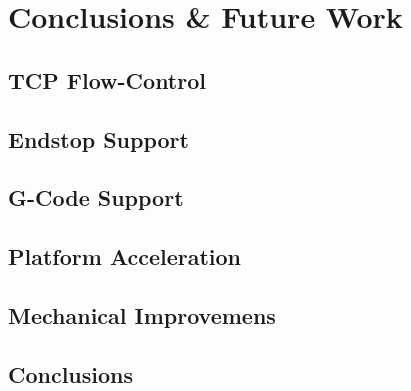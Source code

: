 \chapter{Conclusions \& Future Work}
	
	\section{TCP Flow-Control}
	
	\section{Endstop Support}
	
	\section{G-Code Support}
	
	\section{Platform Acceleration}
	
	\section{Mechanical Improvemens}
	
	\section{Conclusions}
